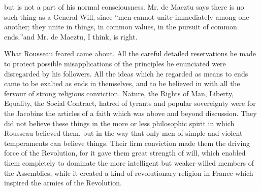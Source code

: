 \documentclass{book}
\begin{document}
but is not a part of his normal consciousness. Mr. de Maeztu says there is no such thing as a General Will, since “men cannot unite immediately among one another; they unite in things, in common values, in the pursuit of common ends,”\footnotemark[3] and Mr. de Maeztu, I think, is right.

What Rousseau feared came about. All the careful detailed reservations he made to protect possible misapplications of the principles he enunciated were disregarded by his followers. All the ideas which he regarded as means to ends came to be exalted as ends in themselves, and to be believed in with all the fervour of strong religious conviction. Nature, the Rights of Man, Liberty, Equality, the Social Contract, hatred of tyrants and popular sovereignty were for the Jacobins the articles of a faith which was above and beyond discussion. They did not believe these things in the more or less philosophic spirit in which Rousseau believed them, but in the way that only men of simple and violent temperaments can believe things. Their firm conviction made them the driving force of the Revolution, for it gave them great strength of will, which enabled them completely to dominate the more intelligent but weaker-willed members of the Assemblies, while it created a kind of revolutionary religion in France which inspired the armies of the Revolution.
\end{document}
